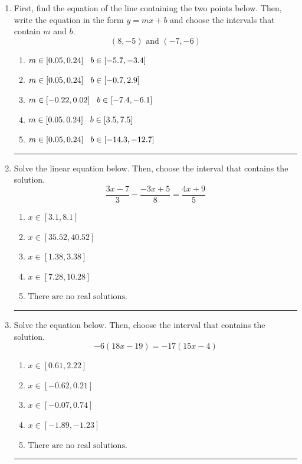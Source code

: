 \documentclass[14pt]{extbook}
\newcommand{\litem}[1]{\item#1\hspace*{-1cm}\rule{\textwidth}{0.4pt}}
\begin{document}
\begin{enumerate}
{\begin{enumerate}[label=\Alph*.]
\end{enumerate} }
\litem{
First, find the equation of the line containing the two points below. Then, write the equation in the form $ y=mx+b $ and choose the intervals that contain $m$ and $b$.\[ (8, -5) \text{ and } (-7, -6) \]\begin{enumerate}[label=\Alph*.]
\item \( m \in [0.05, 0.24] \hspace*{3mm} b \in [-5.7, -3.4] \)
\item \( m \in [0.05, 0.24] \hspace*{3mm} b \in [-0.7, 2.9] \)
\item \( m \in [-0.22, 0.02] \hspace*{3mm} b \in [-7.4, -6.1] \)
\item \( m \in [0.05, 0.24] \hspace*{3mm} b \in [3.5, 7.5] \)
\item \( m \in [0.05, 0.24] \hspace*{3mm} b \in [-14.3, -12.7] \)

\end{enumerate} }
\litem{
Solve the linear equation below. Then, choose the interval that contains the solution.\[ \frac{3x -7}{3} - \frac{-3x + 5}{8} = \frac{4x + 9}{5} \]\begin{enumerate}[label=\Alph*.]
\item \( x \in [3.1, 8.1] \)
\item \( x \in [35.52, 40.52] \)
\item \( x \in [1.38, 3.38] \)
\item \( x \in [7.28, 10.28] \)
\item \( \text{There are no real solutions.} \)

\end{enumerate} }
\litem{
Solve the equation below. Then, choose the interval that contains the solution.\[ -6(18x -19) = -17(15x -4) \]\begin{enumerate}[label=\Alph*.]
\item \( x \in [0.61, 2.22] \)
\item \( x \in [-0.62, 0.21] \)
\item \( x \in [-0.07, 0.74] \)
\item \( x \in [-1.89, -1.23] \)
\item \( \text{There are no real solutions.} \)


\end{enumerate}}
\end{enumerate}
\end{document}
